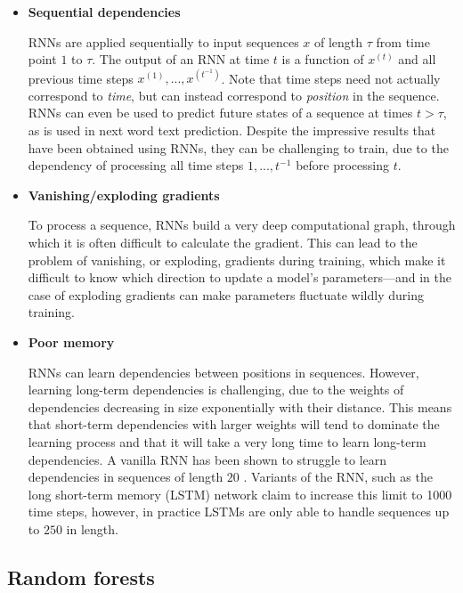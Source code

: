 \begin{itemize}
    \item \textbf{Sequential dependencies}

    RNNs are applied sequentially to input sequences $x$ of length $\tau$ from time point $1$ to $\tau$. The output of an RNN at time $t$ is a function of $x^{(t)}$ and all previous time steps $x^{(1)},...,x^{(t^{-1})}$. Note that time steps need not actually correspond to \emph{time}, but can instead correspond to \emph{position} in the sequence. RNNs can even be used to predict future states of a sequence at times $t > \tau$, as is used in next word text prediction. Despite the impressive results that have been obtained using RNNs, they can be challenging to train, due to the dependency of processing all time steps $1,...,t^{-1}$ before processing $t$.

    \item \textbf{Vanishing/exploding gradients}

    To process a sequence, RNNs build a very deep computational graph, through which it is often difficult to calculate the gradient. This can lead to the problem of vanishing, or exploding, gradients during training, which make it difficult to know which direction to update a model's parameters---and in the case of exploding gradients can make parameters fluctuate wildly during training.

    \item \textbf{Poor memory}

    RNNs can learn dependencies between positions in sequences. However, learning long-term dependencies is challenging, due to the weights of dependencies decreasing in size exponentially with their distance. This means that short-term dependencies with larger weights will tend to dominate the learning process and that it will take a very long time to learn long-term dependencies. A vanilla RNN has been shown to struggle to learn dependencies in sequences of length $20$ \cite{Bengio1994}. Variants of the RNN, such as the long short-term memory (LSTM) network \cite{Hochreiter1997} claim to increase this limit to \num{1000} time steps, however, in practice LSTMs are only able to handle sequences up to $250$ in length.
\end{itemize}

\subsection{Random forests}
\label{sec:intro-rf}

